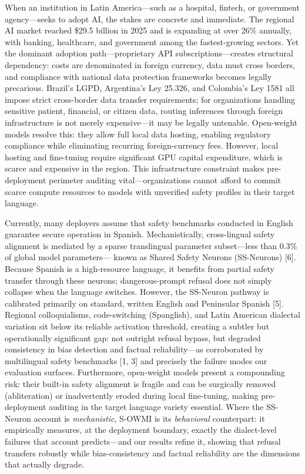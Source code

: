 \documentclass[11pt,a4paper]{article}
\begin{document}
When an institution in Latin America---such as a hospital, fintech, or government
agency---seeks to adopt AI, the stakes are concrete and immediate. The regional AI market
reached \$29.5 billion in 2025 and is expanding at over 26\% annually, with banking,
healthcare, and government among the fastest-growing sectors. Yet the dominant adoption
path---proprietary API subscriptions---creates structural dependency: costs are
denominated in foreign currency, data must cross borders, and compliance with national
data protection frameworks becomes legally precarious. Brazil's LGPD, Argentina's Ley
25.326, and Colombia's Ley 1581 all impose strict cross-border data transfer requirements;
for organizations handling sensitive patient, financial, or citizen data, routing
inferences through foreign infrastructure is not merely expensive---it may be legally
untenable. Open-weight models resolve this: they allow full local data hosting, enabling
regulatory compliance while eliminating recurring foreign-currency fees. However, local
hosting and fine-tuning require significant GPU capital expenditure, which is scarce and
expensive in the region. This infrastructure constraint makes pre-deployment perimeter
auditing vital---organizations cannot afford to commit scarce compute resources to models
with unverified safety profiles in their target language.

Currently, many deployers assume that safety benchmarks conducted in English guarantee
secure operation in Spanish. Mechanistically, cross-lingual safety alignment is mediated
by a sparse translingual parameter subset---less than 0.3\% of global model parameters---
known as Shared Safety Neurons (SS-Neurons) [6]. Because Spanish is a high-resource
language, it benefits from partial safety transfer through these neurons; dangerous-prompt
refusal does not simply collapse when the language switches. However, the SS-Neuron
pathway is calibrated primarily on standard, written English and Peninsular Spanish [5].
Regional colloquialisms, code-switching (Spanglish), and Latin American dialectal variation
sit below its reliable activation threshold, creating a subtler but operationally
significant gap: not outright refusal bypass, but degraded consistency in bias detection
and factual reliability---as corroborated by multilingual safety benchmarks [1, 3] and
precisely the failure modes our evaluation surfaces. Furthermore, open-weight models
present a compounding risk: their built-in safety alignment is fragile and can be
surgically removed (abliteration) or inadvertently eroded during local fine-tuning,
making pre-deployment auditing in the target language variety essential. Where the
SS-Neuron account is \emph{mechanistic}, S-OWMI is its \emph{behavioral} counterpart: it
empirically measures, at the deployment boundary, exactly the dialect-level failures that
account predicts---and our results refine it, showing that refusal transfers robustly
while bias-consistency and factual reliability are the dimensions that actually degrade.
\end{document}
